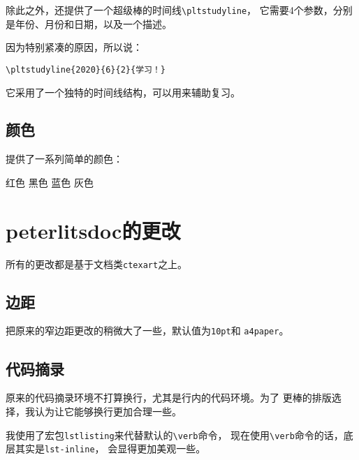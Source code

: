 \documentclass{peterlitsdoc}
\newcommand{\vb}{\verb}
\begin{document}
除此之外，还提供了一个超级棒的时间线\vb|\pltstudyline|，
它需要4个参数，分别是年份、月份和日期，以及一个描述。

因为特别紧凑的原因，所以说：

\begin{lstlisting}
\pltstudyline{2020}{6}{2}{学习！}
\end{lstlisting}


它采用了一个独特的时间线结构，可以用来辅助复习。


\subsection{颜色}

提供了一系列简单的颜色：

\begin{pltrun}
\pltred   红色\pltrule
\pltblack 黑色\pltrule
\pltblue  蓝色\pltrule
\pltgray  灰色\pltrule
\end{pltrun}


\section{peterlitsdoc的更改}

所有的更改都是基于文档类\vb|ctexart|之上。


\subsection{边距}

把原来的窄边距更改的稍微大了一些，默认值为\vb|10pt|和
\vb|a4paper|。


\subsection{代码摘录}

原来的代码摘录环境不打算换行，尤其是行内的代码环境。为了
更棒的排版选择，我认为让它能够换行更加合理一些。

我使用了宏包\vb|lstlisting|来代替默认的\verb|\verb|命令，
现在使用\verb|\verb|命令的话，底层其实是\vb|lst-inline|，
会显得更加美观一些。
\end{document}
